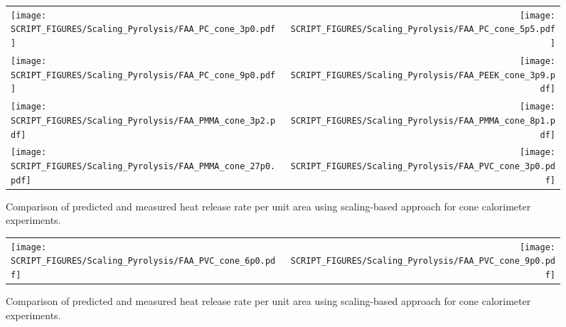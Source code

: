 \begin{figure}[p]
\begin{tabular*}{\textwidth}{l@{\extracolsep{\fill}}r}
\texttt{[image: SCRIPT\_FIGURES/Scaling\_Pyrolysis/FAA\_PC\_cone\_3p0.pdf]} &
\texttt{[image: SCRIPT\_FIGURES/Scaling\_Pyrolysis/FAA\_PC\_cone\_5p5.pdf]} \\
\texttt{[image: SCRIPT\_FIGURES/Scaling\_Pyrolysis/FAA\_PC\_cone\_9p0.pdf]} &
\texttt{[image: SCRIPT\_FIGURES/Scaling\_Pyrolysis/FAA\_PEEK\_cone\_3p9.pdf]} \\
\texttt{[image: SCRIPT\_FIGURES/Scaling\_Pyrolysis/FAA\_PMMA\_cone\_3p2.pdf]} &
\texttt{[image: SCRIPT\_FIGURES/Scaling\_Pyrolysis/FAA\_PMMA\_cone\_8p1.pdf]} \\
\texttt{[image: SCRIPT\_FIGURES/Scaling\_Pyrolysis/FAA\_PMMA\_cone\_27p0.pdf]} &
\texttt{[image: SCRIPT\_FIGURES/Scaling\_Pyrolysis/FAA\_PVC\_cone\_3p0.pdf]} \\
\end{tabular*}
\caption[HRRPUA of FAA Polymers using scaling model ]
{Comparison of predicted and measured heat release rate per unit area using scaling-based approach for cone calorimeter experiments.}
\label{FAA_Polymers_HRR_Polymers}
\end{figure}

\begin{figure}[p]
\begin{tabular*}{\textwidth}{l@{\extracolsep{\fill}}r}
\texttt{[image: SCRIPT\_FIGURES/Scaling\_Pyrolysis/FAA\_PVC\_cone\_6p0.pdf]} &
\texttt{[image: SCRIPT\_FIGURES/Scaling\_Pyrolysis/FAA\_PVC\_cone\_9p0.pdf]} \\
\end{tabular*}
\caption[HRRPUA of FAA Polymers using scaling model ]
{Comparison of predicted and measured heat release rate per unit area using scaling-based approach for cone calorimeter experiments.}
\label{FAA_Polymers_HRR_Polymers}
\end{figure}

